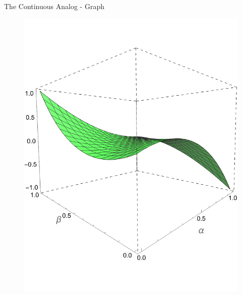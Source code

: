 \documentclass[aspectratio=169]{beamer}
\begin{document}
\begin{frame}{The Continuous Analog - Graph}
\begin{figure}
    \centering
    \includegraphics[scale=0.6]{3DGraph.png}
\end{figure}
\end{frame}


\end{document}
